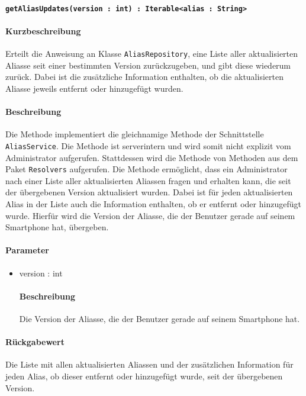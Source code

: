 \paragraph{\texttt{getAliasUpdates(version : int) : Iterable<alias : String>}}%
\paragraph*{Kurzbeschreibung}
Erteilt die Anweisung an Klasse \texttt{AliasRepository}, eine Liste aller aktualisierten Aliasse seit einer bestimmten Version zurückzugeben, und gibt diese wiederum zurück. Dabei ist die zusätzliche Information enthalten, ob die aktualisierten Aliasse jeweils entfernt oder hinzugefügt wurden.
\paragraph*{Beschreibung}
Die Methode implementiert die gleichnamige Methode der Schnittstelle \texttt{AliasService}.
Die Methode ist serverintern und wird somit nicht explizit vom Administrator aufgerufen.
Stattdessen wird die Methode von Methoden aus dem Paket \texttt{Resolvers} aufgerufen.
Die Methode ermöglicht, dass ein Administrator nach einer Liste aller aktualisierten Aliassen fragen und erhalten kann, die seit der übergebenen Version aktualisiert wurden.
Dabei ist für jeden aktualisierten Alias in der Liste auch die Information enthalten, ob er entfernt oder hinzugefügt wurde.
Hierfür wird die Version der Aliasse, die der Benutzer gerade auf seinem Smartphone hat, übergeben.
\paragraph*{Parameter}
\begin{itemize}
    \item version : int
    		\paragraph*{Beschreibung}
    		Die Version der Aliasse, die der Benutzer gerade auf seinem Smartphone hat.
\end{itemize}
\paragraph*{Rückgabewert}
Die Liste mit allen aktualisierten Aliassen und der zusätzlichen Information für jeden Alias, ob dieser entfernt oder hinzugefügt wurde, seit der übergebenen Version.
